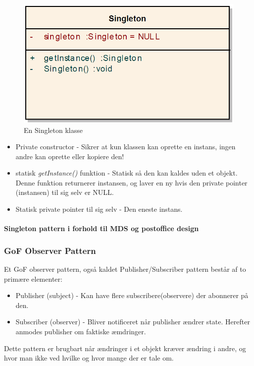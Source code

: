 \begin{figure}[h]
	\centering
	\includegraphics[width=0.6\linewidth]{figs/spm5/SingletonClass}
	\caption{En Singleton klasse}
	\label{fig:SingletonClass}
\end{figure}

\begin{itemize}
	\item Private constructor - Sikrer at kun klassen kan oprette en instans, ingen andre kan oprette eller kopiere den!
	\item statisk \textit{getInstance()} funktion - Statisk så den kan kaldes uden et objekt. Denne funktion returnerer instansen, og laver en ny hvis den private pointer (instansen) til sig selv er NULL.
	\item Statisk private pointer til sig selv - Den eneste instans.
\end{itemize}

\paragraph{Singleton pattern i forhold til MDS og postoffice design}

\subsubsection{GoF Observer Pattern}

Et GoF observer pattern, også kaldet Publisher/Subscriber pattern består af to primære elementer:

\begin{itemize}
	\item Publisher (subject) - Kan have flere subscribere(observere) der abonnerer på den.
	\item Subscriber (observer) - Bliver notificeret når publisher ændrer state. Herefter anmodes publisher om faktiske æmdringer.
\end{itemize}

Dette pattern er brugbart når ændringer i et objekt kræver ændring i andre, og hvor man ikke ved hvilke og hvor mange der er tale om.

